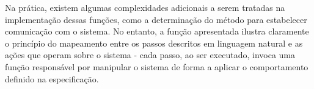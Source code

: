 Na prática, existem algumas complexidades adicionais a serem tratadas na implementação dessas funções, como a determinação do método para estabelecer comunicação 
com o sistema. No entanto, a função apresentada ilustra claramente o princípio do mapeamento entre os passos descritos 
em linguagem natural e as ações que operam sobre o sistema - cada passo, ao ser executado, invoca uma função responsável por manipular o sistema de forma a aplicar o 
comportamento definido na especificação.












